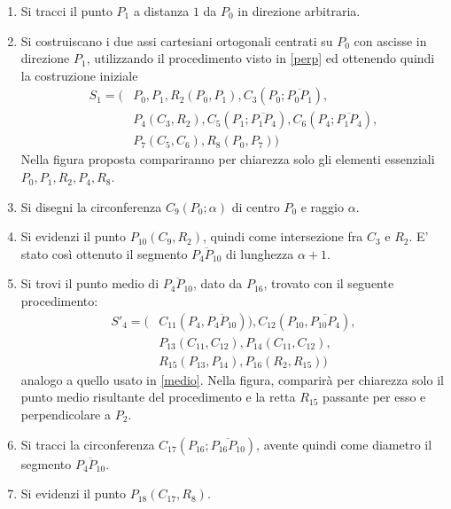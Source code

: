 \begin{enumerate}

\item Si tracci il punto $P_{1}$ a distanza $1$ da $P_{0}$ in direzione arbitraria.

\item Si costruiscano i due assi cartesiani ortogonali centrati su $P_0$ con ascisse in direzione $P_1$, utilizzando il procedimento visto in \ref{perp} ed ottenendo quindi la costruzione iniziale
\begin{align*}
S_{1} = ( &P_{0}, P_{1}, R_{2}(P_{0}, P_{1}), C_{3}(P_{0};\overline{P_{0} P_{1}}), \\
&P_{4}(C_{3}, R_{2} ), C_{5}(P_{1};\overline{P_{1} P_{4}}), C_{6}(P_{4};\overline{P_{1} P_{4}}),\\
&P_{7}(C_{5}, C_{6} ), R_{8}(P_{0}, P_{7}) )
\end{align*}
\noindent
Nella figura proposta compariranno per chiarezza solo gli elementi essenziali $P_0, P_1, R_2, P_4, R_8$.

\item Si disegni la circonferenza $C_{9}(P_{0}; \alpha )$  di centro $P_0$ e raggio $\alpha$.

\item Si evidenzi il punto $P_{10}(C_{9}, R_{2} )$, quindi come intersezione fra $C_{3}$ e $R_{2}$. E' stato così ottenuto il segmento $\overline{P_{4}P_{10}}$ di lunghezza $\alpha + 1$.

\item Si trovi il punto medio di $\overline{P_{4} P_{10}}$, dato da $P_{16}$, trovato con il seguente procedimento: 
\begin{align*}
S'_{4} = ( &C_{11}(P_{4}, \overline{P_{4} P_{10}}) ), C_{12}(P_{10}, \overline{P_{10} P_{4}}), \\
&P_{13}(C_{11},C_{12}), P_{14}(C_{11},C_{12}), \\ 
&R_{15}(P_{13}, P_{14}), P_{16}(R_{2},R_{15}) )
\end{align*}
\noindent
analogo a quello usato in \ref{medio}. Nella figura, comparirà per chiarezza solo il punto medio risultante del procedimento e la retta $R_{15}$ passante per esso e perpendicolare a $P_2$.

\item Si tracci la circonferenza $C_{17}(P_{16};\overline{P_{16}P_{10}})$, avente quindi come diametro il segmento $\overline{P_{4}P_{10}}$.

\item Si evidenzi il punto $P_{18}(C_{17}, R_{8} )$.
\end{enumerate}


